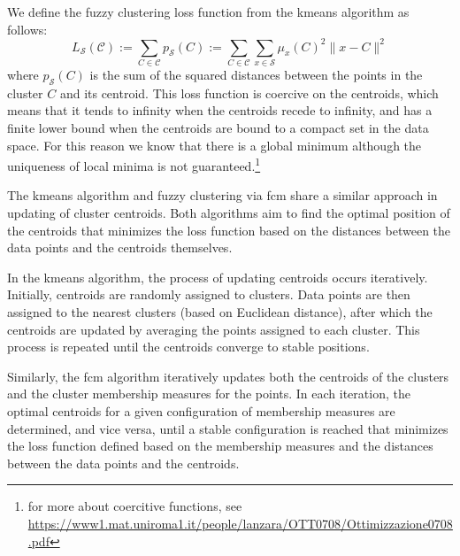 \begin{definition}
	We define the fuzzy clustering loss function from the \gls{kmeans} algorithm as follows:
	\begin{equation}
		L_\mathcal{S}(\mathcal{C}) := \sum_{C\in\mathcal{C}}p_\mathcal{S}(C) := \sum_{C\in\mathcal{C}}\sum_{x \in \mathcal{S}}\mu_x(C)^2\|x-C\|^2
		\label{eq:loss}
	\end{equation}
	where $p_\mathcal{S}(C)$ is the sum of the squared distances between the points in the cluster $C$ and its centroid. This loss function is coercive on the centroids, which means that it tends to infinity when the centroids recede to infinity, and has a finite lower bound when the centroids are bound to a compact set in the data space. For this reason we know that there is a global minimum although the uniqueness of local minima is not guaranteed.\footnote{for more about coercitive functions, see \\ \url{https://www1.mat.uniroma1.it/people/lanzara/OTT0708/Ottimizzazione0708.pdf}}
\end{definition}
\begin{remark}
	The \gls{kmeans} algorithm and fuzzy clustering via \gls{fcm} share a similar approach in updating of cluster centroids. Both algorithms aim to find the optimal position of the centroids that minimizes the loss function based on the distances between the data points and the centroids themselves.

	\noindent In the \gls{kmeans} algorithm, the process of updating centroids occurs iteratively. Initially, centroids are randomly assigned to clusters. Data points are then assigned to the nearest clusters (based on Euclidean distance), after which the centroids are updated by averaging the points assigned to each cluster. This process is repeated until the centroids converge to stable positions.

	\noindent Similarly, the \gls{fcm} algorithm iteratively updates both the centroids of the clusters and the cluster membership measures for the points. In each iteration, the optimal centroids for a given configuration of membership measures are determined, and vice versa, until a stable configuration is reached that minimizes the loss function defined based on the membership measures and the distances between the data points and the centroids.
\end{remark}

